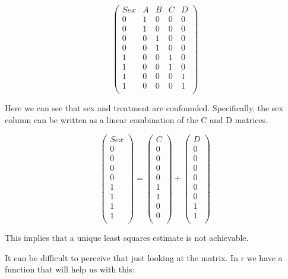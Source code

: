 \documentclass[
  letterpaper,
  DIV=11,
  numbers=noendperiod]{scrartcl}
\begin{document}
\[
\,
\begin{pmatrix}
Sex & A & B & C & D\\
0 & 1 & 0 & 0 & 0 \\
0 & 1 & 0 & 0 & 0 \\
0 & 0 & 1 & 0 & 0 \\
0 & 0 & 1 & 0 & 0 \\
1 & 0 & 0 & 1 & 0 \\
1 & 0 & 0 & 1 & 0 \\
1 & 0 & 0 & 0 & 1 \\
1 & 0 & 0 & 0 & 1\\
\end{pmatrix}
\]

Here we can see that sex and treatment are confounded. Specifically, the
sex column can be written as a linear combination of the C and D
matrices.

\[
\,
\begin{pmatrix}
Sex \\
0\\
0 \\
0 \\
0 \\
1\\
1\\
1 \\
1 \\
\end{pmatrix}
=
\begin{pmatrix}
C \\
0\\
0\\
0\\
0\\
1\\
1\\
0\\
0\\
\end{pmatrix}
+
\begin{pmatrix}
D \\
0\\
0\\
0\\
0\\
0\\
0\\
1\\
1\\
\end{pmatrix}
\]

This implies that a unique least squares estimate is not achievable.

It can be difficult to perceive that just looking at the matrix. In r we
have a function that will help us with this:
\end{document}
